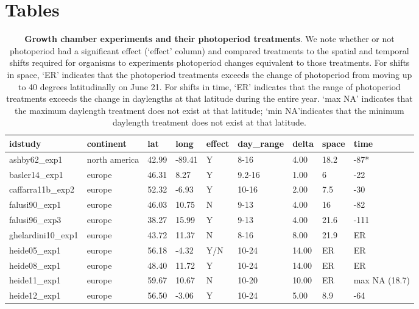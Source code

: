 \documentclass{article}
\begin{document}
\section* {Tables}
\begin{table}[ht]
\centering
\caption{\textbf{Growth chamber experiments and their photoperiod treatments}. We note whether or not photoperiod had a significant effect (`effect' column) and compared treatments to the spatial and temporal shifts required for organisms to experiments photoperiod changes equivalent to those treatments. For shifts in space, `ER' indicates that the photoperiod treatments exceeds the change of photoperiod from moving up to 40 degrees latitudinally on June 21. For shifts in time, `ER' indicates that the range of photoperiod treatments exceeds the change in daylengths at that latitude during the entire year. `max NA' indicates that the maximum daylength treatment does not exist at that latitude; `min NA'indicates that the minimum daylength treatment does not exist at that latitude.} 
\label{table:phototreats}
\begin{tabular}{|p{}|p{}|p{}|p{}|p{}|p{}|p{}|p{}|p{}|}
  \hline
idstudy & continent & lat & long & effect & day\_range & delta & space & time \\ 
  \hline
ashby62\_exp1 & north america & 42.99 & -89.41 & Y & 8-16 & 4.00 & 18.2 & -87* \\ 
  basler14\_exp1 & europe & 46.31 & 8.27 & Y & 9.2-16 & 1.00 & 6 & -22 \\ 
  caffarra11b\_exp2 & europe & 52.32 & -6.93 & Y & 10-16 & 2.00 & 7.5 & -30 \\ 
  falusi90\_exp1 & europe & 46.03 & 10.75 & N & 9-13 & 4.00 & 16 & -82 \\ 
  falusi96\_exp3 & europe & 38.27 & 15.99 & Y & 9-13 & 4.00 & 21.6 & -111 \\ 
  ghelardini10\_exp1 & europe & 43.72 & 11.37 & N & 8-16 & 8.00 & 21.9 & ER \\ 
  heide05\_exp1 & europe & 56.18 & -4.32 & Y/N & 10-24 & 14.00 & ER & ER \\ 
  heide08\_exp1 & europe & 48.40 & 11.72 & Y & 10-24 & 14.00 & ER & ER \\ 
  heide11\_exp1 & europe & 59.67 & 10.67 & N & 10-20 & 10.00 & ER & max NA (18.7) \\ 
  heide12\_exp1 & europe & 56.50 & -3.06 & Y & 10-24 & 5.00 & 8.9 & -64 \\ 

\end{tabular}
\end{table}
\end{document}
